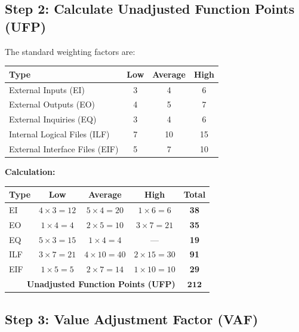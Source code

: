 \documentclass[12pt,a4paper]{article}
\begin{document}
\subsection{Step 2: Calculate Unadjusted Function Points (UFP)}

The standard weighting factors are:

\begin{center}
\begin{tabular}{lccc}
\toprule
\textbf{Type} & \textbf{Low} & \textbf{Average} & \textbf{High} \\
\midrule
External Inputs (EI) & 3 & 4 & 6 \\
External Outputs (EO) & 4 & 5 & 7 \\
External Inquiries (EQ) & 3 & 4 & 6 \\
Internal Logical Files (ILF) & 7 & 10 & 15 \\
External Interface Files (EIF) & 5 & 7 & 10 \\
\bottomrule
\end{tabular}
\end{center}

\bigskip
\noindent\textbf{Calculation:}

\begin{center}
\begin{tabular}{l c c c c}
\toprule
\textbf{Type} & \textbf{Low} & \textbf{Average} & \textbf{High} & \textbf{Total} \\
\midrule
EI & $4 \times 3 = 12$ & $5 \times 4 = 20$ & $1 \times 6 = 6$ & \textbf{38} \\
EO & $1 \times 4 = 4$ & $2 \times 5 = 10$ & $3 \times 7 = 21$ & \textbf{35} \\
EQ & $5 \times 3 = 15$ & $1 \times 4 = 4$ & --- & \textbf{19} \\
ILF & $3 \times 7 = 21$ & $4 \times 10 = 40$ & $2 \times 15 = 30$ & \textbf{91} \\
EIF & $1 \times 5 = 5$ & $2 \times 7 = 14$ & $1 \times 10 = 10$ & \textbf{29} \\
\midrule
\multicolumn{4}{r}{\textbf{Unadjusted Function Points (UFP)}} & $\mathbf{212}$ \\
\bottomrule
\end{tabular}
\end{center}

\subsection{Step 3: Value Adjustment Factor (VAF)}
\end{document}

